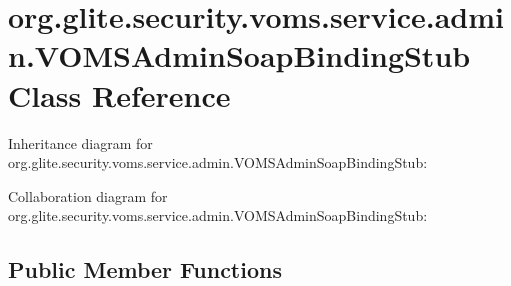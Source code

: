\hypertarget{classorg_1_1glite_1_1security_1_1voms_1_1service_1_1admin_1_1VOMSAdminSoapBindingStub}{
\section{org.glite.security.voms.service.admin.VOMSAdminSoapBindingStub Class Reference}
\label{classorg_1_1glite_1_1security_1_1voms_1_1service_1_1admin_1_1VOMSAdminSoapBindingStub}
}


Inheritance diagram for org.glite.security.voms.service.admin.VOMSAdminSoapBindingStub:


Collaboration diagram for org.glite.security.voms.service.admin.VOMSAdminSoapBindingStub:
\subsection*{Public Member Functions}
